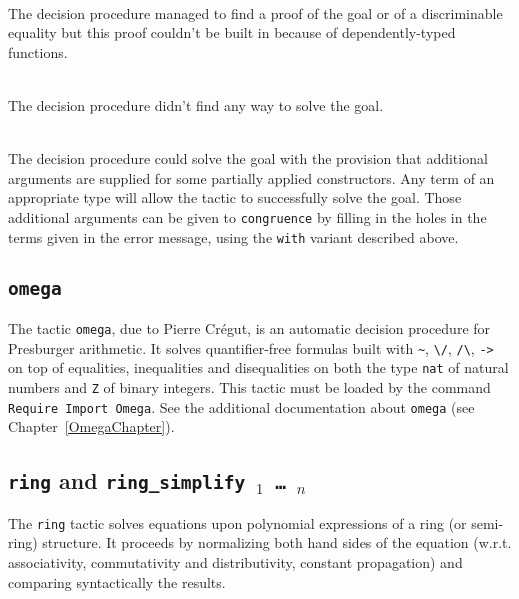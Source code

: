 \begin{coq_example*}
\begin{ErrMsgs}
  \item {} \\
    The decision procedure managed to find a proof of the goal or of
    a discriminable equality but this proof couldn't be built in {\Coq}
    because of dependently-typed functions.
  \item {} \\
    The decision procedure didn't find any way to solve the goal.
  \item {} \\
    The decision procedure could solve the goal with the provision
    that additional arguments are supplied for some partially applied
    constructors. Any term of an appropriate type will allow the
    tactic to successfully solve the goal. Those additional arguments
    can be given to {\tt congruence} by filling in the holes in the
    terms given in the error message, using the {\tt with} variant
    described above.
\end{ErrMsgs}

\subsection{\tt omega
\label{omega}}

The tactic \texttt{omega}, due to Pierre Cr{\'e}gut,
is an automatic decision procedure for Presburger
arithmetic. It solves quantifier-free
formulas built with \verb|~|, \verb|\/|, \verb|/\|,
\verb|->| on top of equalities, inequalities and disequalities on
both the type \texttt{nat} of natural numbers and \texttt{Z} of binary
integers. This tactic must be loaded by the command \texttt{Require Import
  Omega}. See the additional documentation about \texttt{omega}
(see Chapter~\ref{OmegaChapter}).

\subsection{{\tt ring} and {\tt ring\_simplify \term$_1$ \dots\ \term$_n$}
}

The {\tt ring} tactic solves equations upon polynomial expressions of
a ring (or semi-ring) structure. It proceeds by normalizing both hand
sides of the equation (w.r.t. associativity, commutativity and
distributivity, constant propagation) and comparing syntactically the
results.


\end{coq_example*}
